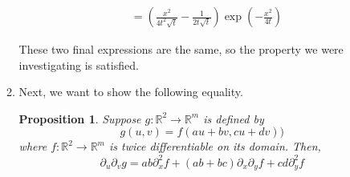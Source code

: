 \documentclass[letterpaper,11pt]{article}
\newtheorem{prop}{Proposition}
\newcommand{\R}{\mathbb{R}}
\newcommand{\parens}[1]{\left(#1\right)}
\begin{document}
\begin{enumerate}
\begin{enumerate}
\begin{align*}
{{                        }
                    } \\
                    &=
                    \parens{
                        \frac{
                            x^2
                        }{
                            4 t^2 \sqrt{t}
                        }
                        -
                        \frac{
                            1
                        }{
                            2 t \sqrt{t}
                        }
                    }
                    \exp\parens{
                        - \frac{
                            x^2
                        }{
                            4 t
                        }
                    }
                \end{align*}

                These two final expressions are the same, so the property we
                were investigating is satisfied.

            \item
                Next, we want to show the following equality.

                \begin{prop}
                    Suppose $g : \R^2 \to \R^m$ is defined by
                    \begin{equation*}
                        g(u, v) = f(au + bv, cu + dv))
                    \end{equation*}
                    where $f : \R^2 \to \R^m$ is twice differentiable on its
                    domain.
                    Then,
                    \begin{equation*}
                        \partial_u \partial_v g
                        =
                        ab \partial_x^2 f
                        +
                        \parens{ab + bc} \partial_x \partial_y f
                        +
                        cd \partial_y^2 f
                    \end{equation*}
                \end{prop}


\end{enumerate}
\end{enumerate}
\end{document}
